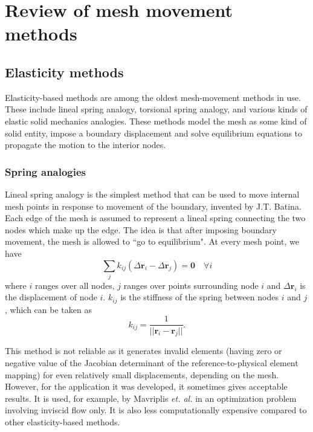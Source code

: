 \chapter{Review of mesh movement methods}
 
 \section{Elasticity methods}
 Elasticity-based methods are among the oldest mesh-movement methods in use. These include lineal spring analogy, torsional spring analogy, and various kinds of elastic solid mechanics analogies. These methods model the mesh as some kind of solid entity, impose a boundary displacement and solve equilibrium equations to propagate the motion to the interior nodes.
 
 \subsection{Spring analogies}
 
 Lineal spring analogy is the simplest method that can be used to move internal mesh points in response to movement of the boundary, invented by J.T. Batina. Each edge of the mesh is assumed to represent a lineal spring connecting the two nodes which make up the edge. The idea is that after imposing boundary movement, the mesh is allowed to ``go to equilibrium". At every mesh point, we have
 \begin{equation}
 \sum_j k_{ij}(\Delta \mathbf{r}_i - \Delta \mathbf{r}_j) = \mathbf{0} \quad \forall i
 \label{spring}
 \end{equation}
 where $i$ ranges over all nodes, $j$ ranges over points surrounding node $i$ and $\Delta \mathbf{r}_i$ is the displacement of node $i$.
 $k_{ij}$ is the stiffness of the spring between nodes $i$ and $j$, which can be taken as
 \begin{equation}
 k_{ij} = \frac{1}{||\mathbf{r}_i - \mathbf{r}_j||}.
 \end{equation}
 
 This method is not reliable as it generates invalid elements (having zero or negative value of the Jacobian determinant of the reference-to-physical element mapping) for even relatively small displacements, depending on the mesh. However, for the application it was developed, it sometimes gives acceptable results. It is used, for example, by Mavriplis \emph{et. al.} \cite{appl:mavriplis} in an optimization problem involving inviscid flow only. It is also less computationally expensive compared to other elasticity-based methods.
 

